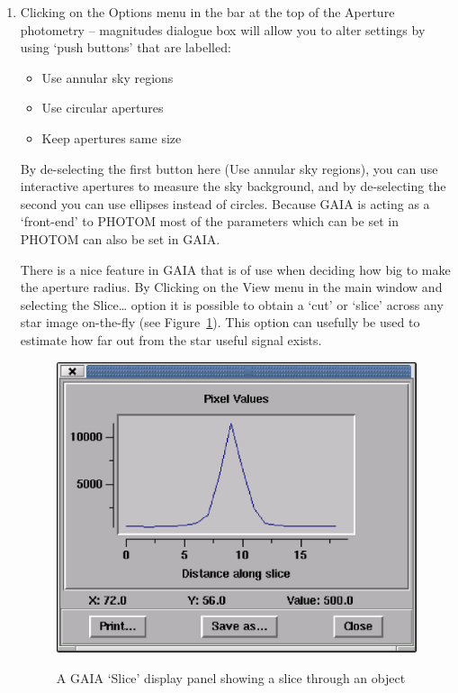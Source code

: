 \documentclass[twoside,11pt]{article}
\begin{document}
\begin{enumerate}
  \item Clicking on the {\sf Options} menu in the bar at the top of the
   {\sf Aperture photometry -- magnitudes} dialogue box will allow you to
   alter settings by using `push buttons' that are labelled:

  \begin{itemize}

     \item {\sf Use annular sky regions}

     \item {\sf Use circular apertures}

     \item {\sf Keep apertures same size}

  \end{itemize}

   By de-selecting the first button here ({\sf Use annular sky
   regions}), you can use interactive apertures to measure the sky
   background, and by de-selecting the second you can use ellipses
   instead of circles.  Because GAIA is acting as a `front-end' to
   PHOTOM most of the parameters which can be set in PHOTOM can also
   be set in GAIA.

   There is a nice feature in GAIA that is of use when deciding how
   big to make the aperture radius. By Clicking on the {\sf View} menu
   in the main window and selecting the {\sf Slice\ldots} option it is
   possible to obtain a `cut' or `slice' across any star image on-the-fly
   (see Figure~\ref{PHOTOM_R_SLICE}).  This option can usefully be used to
   estimate how far out from the star useful signal exists.

  \begin{figure}[htbp]
     \centering
     \includegraphics[totalheight=3.25in]{sc17_photom_r_slice.ps}
     \begin{quote}
     \caption[A GAIA `{\sf Slice}' display panel]
      {A GAIA `{\sf Slice}' display panel showing a slice through an object
     \label{PHOTOM_R_SLICE} }
     \end{quote}
  \end{figure}


\end{enumerate}
\end{document}
